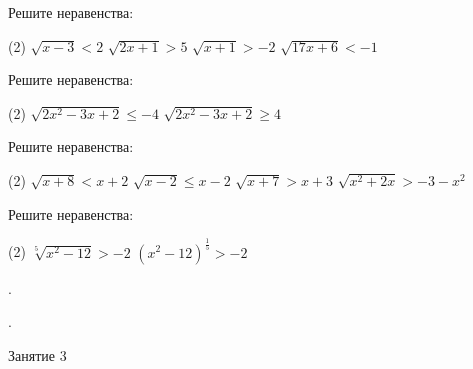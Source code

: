 %
%

\begin{class}[number=1]
	\begin{listofex}
		\item Решите неравенства:
		\begin{tasks}(2)
			\task \( \sqrt{x-3}<2 \)
			\task \( \sqrt{2x+1}>5 \)
			\task \( \sqrt{x+1}>-2 \)
			\task \( \sqrt{17x+6}<-1 \)
		\end{tasks}
		\item Решите неравенства:
		\begin{tasks}(2)
			\task \( \sqrt{2x^2-3x+2}\le-4 \)
			\task \( \sqrt{2x^2-3x+2}\ge4 \)
		\end{tasks}
		\item Решите неравенства:
		\begin{tasks}(2)
			\task \( \sqrt{x+8}<x+2 \)
			\task \( \sqrt{x-2}\le x-2 \)
			\task \( \sqrt{x+7}>x+3 \)
			\task \( \sqrt{x^2+2x}>-3-x^2 \)
		\end{tasks}
		\item Решите неравенства:
		\begin{tasks}(2)
			\task \( \sqrt[5]{x^2-12}>-2 \)
			\task \( (x^2-12)^{\tfrac{1}{5}}>-2 \)
		\end{tasks}
	\end{listofex}
\end{class}

\begin{homework}[number=1]
	\begin{listofex}
		\item .
	\end{listofex}
\end{homework}

\begin{class}[number=2]
	\begin{listofex}
		\item .
	\end{listofex}
\end{class}
\begin{class}[number=3]
	\begin{listofex}
		\item Занятие 3
	\end{listofex}
\end{class}

